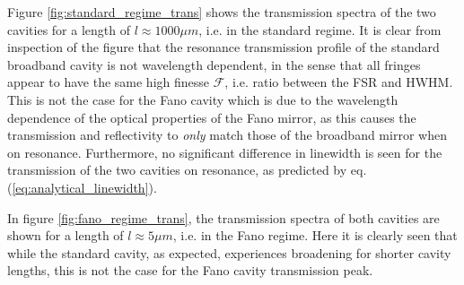 Figure \ref{fig:standard_regime_trans} shows the transmission spectra of the two cavities for a length of $l \approx 1000\mu m$, i.e. in the standard regime. It is clear from inspection of the figure that the resonance transmission profile of the standard broadband cavity is not wavelength dependent, in the sense that all fringes appear to have the same high finesse $\mathcal{F}$, i.e. ratio between the FSR and HWHM. This is not the case for the Fano cavity which is due to the wavelength dependence of the optical properties of the Fano mirror, as this causes the transmission and reflectivity to \emph{only} match those of the broadband mirror when on resonance. Furthermore, no significant difference in linewidth is seen for the transmission of the two cavities on resonance, as predicted by eq. (\ref{eq:analytical_linewidth}).

In figure \ref{fig:fano_regime_trans}, the transmission spectra of both cavities are shown for a length of $l\approx 5 \mu m$, i.e. in the Fano regime. Here it is clearly seen that while the standard cavity, as expected, experiences broadening for shorter cavity lengths, this is not the case for the Fano cavity transmission peak.

